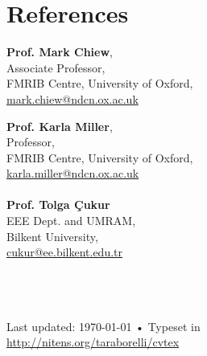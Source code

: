 \documentclass[10pt, a4paper]{article}
\begin{document}
\section*{References}
\begin{multicols}{2}

\textbf{Prof. Mark Chiew},\\
Associate Professor,\\
FMRIB Centre, University of Oxford, \\
\href{mailto:mark.chiew@ndcn.ox.ac.uk}{mark.chiew@ndcn.ox.ac.uk}

\textbf{Prof. Karla Miller},\\
Professor,\\
FMRIB Centre, University of Oxford, \\
\href{mailto:karla.miller@ndcn.ox.ac.uk}{karla.miller@ndcn.ox.ac.uk}
\\
\\
\textbf{Prof. Tolga \c{C}ukur}\\
EEE Dept. and UMRAM, \\
Bilkent University, \\
\href{mailto:cukur@ee.bilkent.edu.tr}{cukur@ee.bilkent.edu.tr}
\\
\\
\\
\\


\end{multicols}
\vfill{}

\begin{center}
{\scriptsize  Last updated: \today\- •\- 
Typeset in \href{http://nitens.org/taraborelli/cvtex}{
\XeTeX }\\
\href{http://nitens.org/taraborelli/cvtex}{http://nitens.org/taraborelli/cvtex}}
\end{center}
\end{document}
